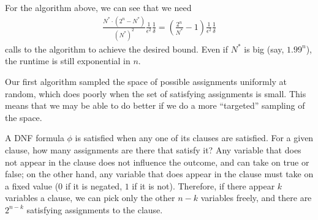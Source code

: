 \documentclass[11pt]{article}
\begin{document}

For the algorithm above, we can see that we need
%
\begin{align*}
	\frac{N^* \cdot (2^n - N^*)}{(N^*)^2} \frac{1}{\epsilon^2}\frac{1}{\delta} = \left(\frac{2^n}{N^*} - 1\right) \frac{1}{\epsilon^2}\frac{1}{\delta}
\end{align*}
%
calls to the algorithm to achieve the desired bound. Even if $N^*$ is big (say, $1.99^n$), the runtime is still exponential in $n$.

Our first algorithm sampled the space of possible assignments uniformly at random, which does poorly when the set of satisfying assignments is small. This means that we may be able to do better if we do a more ``targeted'' sampling of the space.

A DNF formula $\phi$ is satisfied when any one of its clauses are satisfied. For a given clause, how many assignments are there that satisfy it? Any variable that does not appear in the clause does not influence the outcome, and can take on true or false; on the other hand, any variable that does appear in the clause must take on a fixed value ($0$ if it is negated, $1$ if it is not). Therefore, if there appear $k$ variables a clause, we can pick only the other $n-k$ variables freely, and there are $2^{n-k}$ satisfying assignments to the clause.
\end{document}

